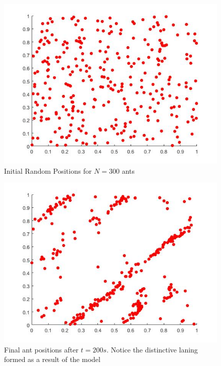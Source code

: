 \begin{figure}
    \centering
    \includegraphics[scale = 0.35]{figures/init_random_pos.jpg}
    \caption{Initial Random Positions for $N = 300$ ants}
    \label{fig:initrandompos}
\end{figure}
\begin{figure}
    \centering
    \includegraphics[scale = 0.35]{figures/final_pos_laning.jpg}
    \caption{Final ant positions after $t = 200 s$. Notice the distinctive laning formed as a result of the model}
    \label{fig:finalpos}
\end{figure}
